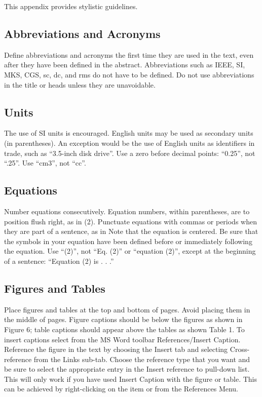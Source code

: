 \documentclass[10pt]{article}
\begin{document}
This appendix provides stylistic guidelines. %

\subsection{Abbreviations and Acronyms}
Define abbreviations and acronyms the first time they are used in the text, even after they have been defined in the abstract. Abbreviations such as IEEE, SI, MKS, CGS, sc, dc, and rms do not have to be defined. Do not use abbreviations in the title or heads unless they are unavoidable.

\subsection{Units}
The use of SI units is encouraged. English units may be used as secondary units (in parentheses). An exception would be the use of English units as identifiers in trade, such as “3.5-inch disk drive”. Use a zero before decimal points: “0.25”, not “.25”. Use “cm3”, not “cc”.
 
\subsection{Equations}
Number equations consecutively. Equation numbers, within parentheses, are to position flush right, as in (2). Punctuate equations with commas or periods when they are part of a sentence, as in
Note that the equation is centered. Be sure that the symbols in your equation have been defined before or immediately following the equation. Use “(2)”, not “Eq. (2)” or “equation (2)”, except at the beginning of a sentence: “Equation (2) is . . .”

\subsection{Figures and Tables}
Place figures and tables at the top and bottom of pages. Avoid placing them in the middle of pages. Figure captions should be below the figures as shown in Figure 6; table captions should appear above the tables as shown Table 1. To insert captions select from the MS Word toolbar References/Insert Caption.  Reference the figure in the text by choosing the Insert tab and selecting Cross-reference from the Links sub-tab.  Choose the reference type that you want and be sure to select the appropriate entry in the Insert reference to pull-down list.  This will only work if you have used Insert Caption with the figure or table. This can be achieved by right-clicking on the item or from the References Menu.
%
%
\end{document}
